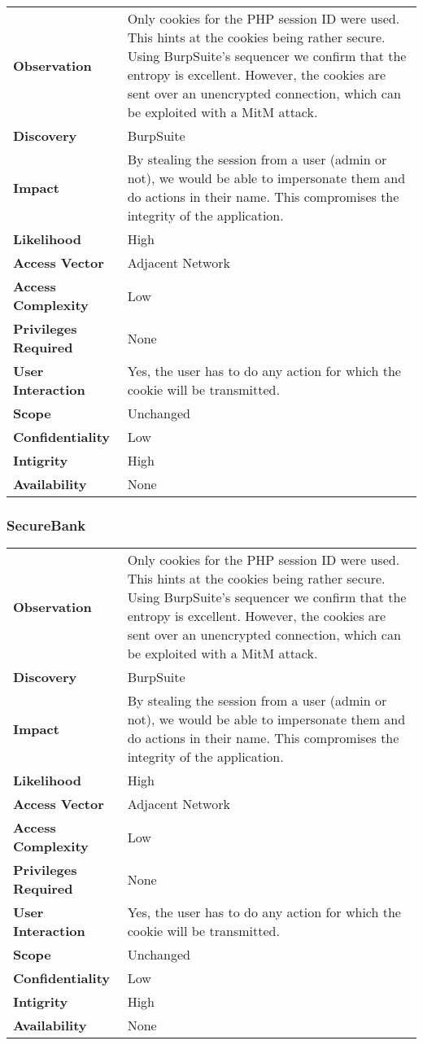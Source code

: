 \begin{tabular}{l|p{10cm}}
\textbf{Observation} & Only cookies for the PHP session ID were used. This hints at the cookies being rather secure. Using BurpSuite's sequencer we confirm that the entropy is excellent. However, the cookies are sent over an unencrypted connection, which can be exploited with a MitM attack. \\
\textbf{Discovery} & BurpSuite \\
\textbf{Impact} & By stealing the session from a user (admin or not), we would be able to impersonate them and do actions in their name. This compromises the integrity of the application. \\
\textbf{Likelihood} & High \\
\textbf{Access Vector} & Adjacent Network \\
\textbf{Access Complexity} & Low\\
\textbf{Privileges Required} & None \\
\textbf{User Interaction} & Yes, the user has to do any action for which the cookie will be transmitted. \\
\textbf{Scope} & Unchanged \\
\textbf{Confidentiality} & Low \\
\textbf{Intigrity} & High\\
\textbf{Availability} & None \\
\end{tabular}

\subsubsection*{SecureBank}

\begin{tabular}{l|p{10cm}}
\textbf{Observation} & Only cookies for the PHP session ID were used. This hints at the cookies being rather secure. Using BurpSuite's sequencer we confirm that the entropy is excellent. However, the cookies are sent over an unencrypted connection, which can be exploited with a MitM attack. \\
\textbf{Discovery} & BurpSuite \\
\textbf{Impact} & By stealing the session from a user (admin or not), we would be able to impersonate them and do actions in their name. This compromises the integrity of the application. \\
\textbf{Likelihood} & High \\
\textbf{Access Vector} & Adjacent Network \\
\textbf{Access Complexity} & Low\\
\textbf{Privileges Required} & None \\
\textbf{User Interaction} & Yes, the user has to do any action for which the cookie will be transmitted. \\
\textbf{Scope} & Unchanged \\
\textbf{Confidentiality} & Low \\
\textbf{Intigrity} & High\\
\textbf{Availability} & None \\
\end{tabular}


